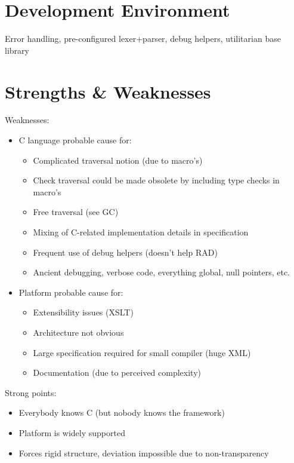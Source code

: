 \documentclass[twoside,openright]{uva-bachelor-thesis}
\begin{document}
	\section{Development Environment}
		Error handling, pre-configured lexer+parser, debug helpers, utilitarian base library
	
	\section{Strengths \& Weaknesses}
		\label{subsec:analysis-summary}
		Weaknesses:
		\begin{itemize}
			\item C language probable cause for:
			\begin{itemize}
				\item Complicated traversal notion (due to macro's)
				\item Check traversal could be made obsolete by including type checks in macro's
				\item Free traversal (see GC)
				\item Mixing of C-related implementation details in specification
				\item Frequent use of debug helpers (doesn't help RAD)
				\item Ancient debugging, verbose code, everything global, null pointers, etc.
			\end{itemize}
			\item Platform probable cause for:
			\begin{itemize}
				\item Extensibility issues (XSLT)
				\item Architecture not obvious
				\item Large specification required for small compiler (huge XML)
				\item Documentation (due to perceived complexity)
			\end{itemize}
		\end{itemize}
		Strong points:
		\begin{itemize}
			\item Everybody knows C (but nobody knows the framework)
			\item Platform is widely supported
			\item Forces rigid structure, deviation impossible due to non-transparency
		\end{itemize}
	
	
\end{document}
